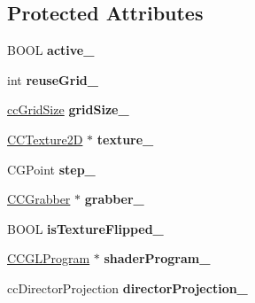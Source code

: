 \subsection*{Protected Attributes}
\begin{DoxyCompactItemize}
\item 
\hypertarget{interface_c_c_grid_base_a28688ffb5ba7fdd6f76aaf50db83ce6e}{B\-O\-O\-L {\bfseries active\-\_\-}}\label{interface_c_c_grid_base_a28688ffb5ba7fdd6f76aaf50db83ce6e}

\item 
\hypertarget{interface_c_c_grid_base_a7f05c01c5ec0fcf7822daf7111d6c98e}{int {\bfseries reuse\-Grid\-\_\-}}\label{interface_c_c_grid_base_a7f05c01c5ec0fcf7822daf7111d6c98e}

\item 
\hypertarget{interface_c_c_grid_base_ad0930a939e38a2a8bceb14b9c3b2d414}{\hyperlink{cc_types_8h_a66489f5c8efbdb2aa26ecbf9184ec8ea}{cc\-Grid\-Size} {\bfseries grid\-Size\-\_\-}}\label{interface_c_c_grid_base_ad0930a939e38a2a8bceb14b9c3b2d414}

\item 
\hypertarget{interface_c_c_grid_base_a00c126d54a069d5c260457b4d5bc0c4c}{\hyperlink{class_c_c_texture2_d}{C\-C\-Texture2\-D} $\ast$ {\bfseries texture\-\_\-}}\label{interface_c_c_grid_base_a00c126d54a069d5c260457b4d5bc0c4c}

\item 
\hypertarget{interface_c_c_grid_base_a66f22f4ba01645bd6069c1e5687cdbc8}{C\-G\-Point {\bfseries step\-\_\-}}\label{interface_c_c_grid_base_a66f22f4ba01645bd6069c1e5687cdbc8}

\item 
\hypertarget{interface_c_c_grid_base_a89f6a43f4434ae9010169e0960ad44c2}{\hyperlink{interface_c_c_grabber}{C\-C\-Grabber} $\ast$ {\bfseries grabber\-\_\-}}\label{interface_c_c_grid_base_a89f6a43f4434ae9010169e0960ad44c2}

\item 
\hypertarget{interface_c_c_grid_base_aa272f174bf48b59c837d467a708d813d}{B\-O\-O\-L {\bfseries is\-Texture\-Flipped\-\_\-}}\label{interface_c_c_grid_base_aa272f174bf48b59c837d467a708d813d}

\item 
\hypertarget{interface_c_c_grid_base_a66baee7dc93fca9cd5061b9314003973}{\hyperlink{interface_c_c_g_l_program}{C\-C\-G\-L\-Program} $\ast$ {\bfseries shader\-Program\-\_\-}}\label{interface_c_c_grid_base_a66baee7dc93fca9cd5061b9314003973}

\item 
\hypertarget{interface_c_c_grid_base_a58bdadd8db16a66645a5b0df3ccca2bc}{cc\-Director\-Projection {\bfseries director\-Projection\-\_\-}}\label{interface_c_c_grid_base_a58bdadd8db16a66645a5b0df3ccca2bc}

\end{DoxyCompactItemize}
